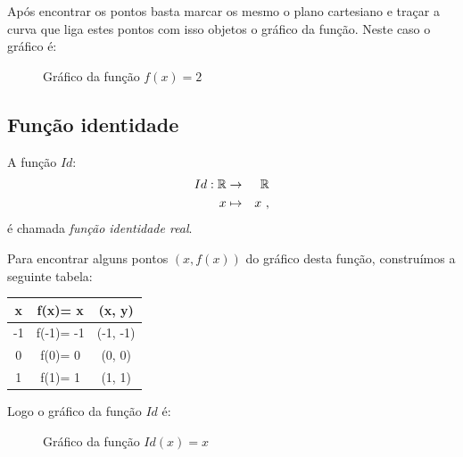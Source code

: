 Após encontrar os pontos basta marcar os mesmo o plano cartesiano e traçar a curva que liga estes pontos com isso objetos o gráfico da função. Neste caso o gráfico é:
\begin{figure}[H]
 \centering
    \caption{Gráfico da função $f(x)=2$}
  \end{figure}

\subsection{Função identidade}

A função $Id$:
\begin{eqnarray*}
 Id: \mathbb{R} & \rightarrow & \mathbb{R} \\
 x & \mapsto & x \ ,
\end{eqnarray*}
é chamada \textit{função identidade real}.

Para encontrar alguns pontos $(x, f(x))$ do gráfico desta função, construímos a seguinte tabela:

 \begin{table}[H]
 \centering
 \begin{tabular}{|c|c|c|} \hline
 \rowcolor{cinza}
  x & f(x)= x & (x, y)  \\\hline
  -1 & f(-1)= -1 & (-1, -1) \\\hline
   0 & f(0)= 0 & (0, 0)  \\\hline
   1 & f(1)= 1 & (1, 1) \\\hline
 \end{tabular}
\end{table}

Logo o gráfico da função $Id$ é:
\begin{figure}[H]
 \centering
    \caption{Gráfico da função $Id(x)=x$}
  \end{figure}


